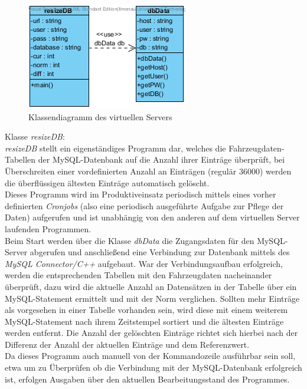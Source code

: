\documentclass[fontsize = 12pt, paper = a4]{scrreprt}
\begin{document}
\newpage

\begin{figure}[h]
\centering
\includegraphics[scale = 0.75]{resizeDB}
\caption[Klassendiagramm des virtuellen Servers]{Klassendiagramm des virtuellen Servers}
\label{resizeDB}
\end{figure}

Klasse \textit{resizeDB}:\\
\textit{resizeDB} stellt ein eigenständiges Programm dar, welches die Fahrzeugdaten-Tabellen der MySQL-Datenbank auf die Anzahl ihrer Einträge überprüft, bei Überschreiten einer vordefinierten Anzahl an Einträgen (regulär 36000) werden die überflüssigen ältesten Einträge automatisch gelöscht.\\
Dieses Programm wird im Produktiveinsatz periodisch mittels eines vorher definierten \textit{Cronjobs} (also eine periodisch ausgeführte Aufgabe zur Pflege der Daten) aufgerufen und ist unabhängig von den anderen auf dem virtuellen Server laufenden Programmen.\\
Beim Start werden über die Klasse \textit{dbData} die Zugangsdaten für den MySQL-Server abgerufen und anschließend eine Verbindung zur Datenbank mittels des \textit{MySQL Connector/C++} aufgebaut.
War der Verbindungsaufbau erfolgreich, werden die entsprechenden Tabellen mit den Fahrzeugdaten nacheinander überprüft, dazu wird die aktuelle Anzahl an Datensätzen in der Tabelle über ein MySQL-Statement ermittelt und mit der Norm verglichen.
Sollten mehr Einträge als vorgesehen in einer Tabelle vorhanden sein, wird diese mit einem weiterem MySQL-Statement nach ihrem Zeitstempel sortiert und die ältesten Einträge werden entfernt.
Die Anzahl der gelöschten Einträge richtet sich hierbei nach der Differenz der Anzahl der aktuellen Einträge und dem Referenzwert.\\
Da dieses Programm auch manuell von der Kommandozeile ausführbar sein soll, etwa um zu Überprüfen ob die Verbindung mit der MySQL-Datenbank erfolgreich ist, erfolgen Ausgaben über den aktuellen Bearbeitungsstand des Programmes.\\
\end{document}
